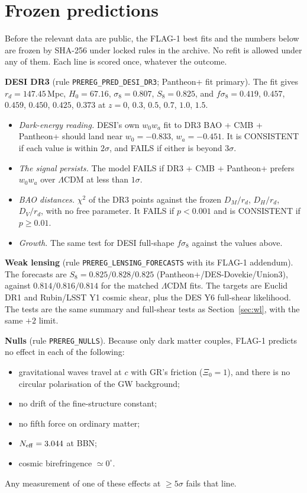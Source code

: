 \documentclass[11pt]{article}
\begin{document}
\section{Frozen predictions}\label{sec:pred}
Before the relevant data are public, the FLAG-1 best fits and the numbers below are frozen by SHA-256 under locked rules
in the archive. No refit is allowed under any of them. Each line is scored once, whatever the outcome.

\textbf{DESI DR3} (rule \texttt{PREREG\_PRED\_DESI\_DR3}; Pantheon+ fit primary). The fit gives $r_d=147.45$\,Mpc,
$H_0=67.16$, $\sigma_8=0.807$, $S_8=0.825$, and $f\sigma_8=0.419$, $0.457$, $0.459$, $0.450$, $0.425$, $0.373$ at
$z=0$, $0.3$, $0.5$, $0.7$, $1.0$, $1.5$.
\begin{itemize}\setlength\itemsep{0pt}
\item[P1] \emph{Dark-energy reading.} DESI's own $w_0w_a$ fit to DR3 BAO + CMB + Pantheon+ should land near
$w_0=-0.833$, $w_a=-0.451$. It is CONSISTENT if each value is within $2\sigma$, and FAILS if either is beyond $3\sigma$.
\item[P2] \emph{The signal persists.} The model FAILS if DR3 + CMB + Pantheon+ prefers $w_0w_a$ over $\Lambda$CDM at
less than $1\sigma$.
\item[P3] \emph{BAO distances.} $\chi^2$ of the DR3 points against the frozen $D_M/r_d$, $D_H/r_d$, $D_V/r_d$, with no
free parameter. It FAILS if $p<0.001$ and is CONSISTENT if $p\ge0.01$.
\item[P4] \emph{Growth.} The same test for DESI full-shape $f\sigma_8$ against the values above.
\end{itemize}

\textbf{Weak lensing} (rule \texttt{PREREG\_LENSING\_FORECASTS} with its FLAG-1 addendum). The forecasts are
$S_8=0.825/0.828/0.825$ (Pantheon+/DES-Dovekie/Union3), against $0.814/0.816/0.814$ for the matched $\Lambda$CDM fits. The
targets are Euclid DR1 and Rubin/LSST Y1 cosmic shear, plus the DES Y6 full-shear likelihood. The tests are the same
summary and full-shear tests as Section~\ref{sec:wl}, with the same $+2$ limit.

\textbf{Nulls} (rule \texttt{PREREG\_NULLS}). Because only dark matter couples, FLAG-1 predicts no effect in each of the
following:
\begin{itemize}\setlength\itemsep{0pt}
\item gravitational waves travel at $c$ with GR's friction ($\Xi_0=1$), and there is no circular polarisation of the GW
background;
\item no drift of the fine-structure constant;
\item no fifth force on ordinary matter;
\item $N_{\rm eff}=3.044$ at BBN;
\item cosmic birefringence $\simeq0^\circ$.
\end{itemize}
Any measurement of one of these effects at $\ge5\sigma$ fails that line.
\end{document}
